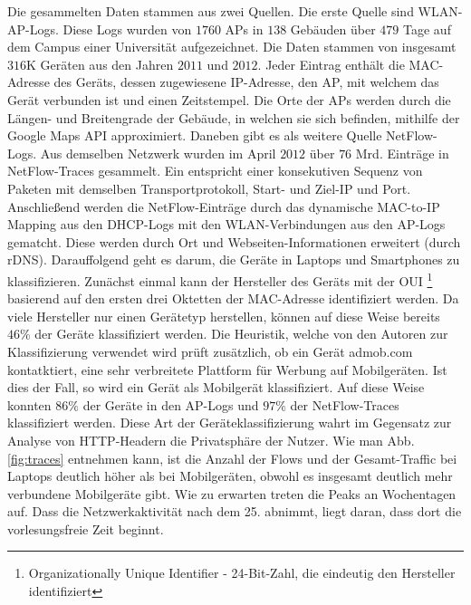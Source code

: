 \documentclass[12pt, a4paper]{article}
\begin{document}
Die gesammelten Daten stammen aus zwei Quellen. Die erste Quelle sind WLAN-AP-Logs. Diese Logs wurden von $1760$ APs in $138$ Gebäuden über $479$ Tage auf dem
Campus einer Universität aufgezeichnet. Die Daten stammen von insgesamt $316$\textsc{K} Geräten aus den Jahren $2011$ und $2012$.
Jeder Eintrag enthält die MAC-Adresse des Geräts, dessen zugewiesene IP-Adresse, den AP, mit welchem das Gerät verbunden ist
und einen Zeitstempel.
Die Orte der APs werden durch die Längen- und Breitengrade der Gebäude, in welchen sie sich befinden, mithilfe der Google Maps API
approximiert. Daneben gibt es als weitere Quelle NetFlow-Logs. Aus demselben Netzwerk wurden im April $2012$ über $76$ Mrd.
Einträge in NetFlow-Traces gesammelt. Ein  entspricht einer konsekutiven Sequenz von Paketen mit demselben
Transportprotokoll, Start- und Ziel-IP und Port. \cite{Alipour2018}
Anschließend werden die NetFlow-Einträge durch das dynamische MAC-to-IP Mapping aus den DHCP-Logs mit den WLAN-Verbindungen
aus den AP-Logs gematcht. Diese werden durch Ort und Webseiten-Informationen erweitert (durch rDNS).
\newline\newline
Darauffolgend geht es darum, die Geräte in Laptops und Smartphones zu klassifizieren.
Zunächst einmal kann der Hersteller des Geräts mit der OUI \footnote{Organizationally Unique Identifier - 24-Bit-Zahl, die eindeutig den Hersteller identifiziert} basierend auf den
ersten drei Oktetten der MAC-Adresse identifiziert werden. Da viele Hersteller nur einen Gerätetyp herstellen, können auf diese Weise bereits
$46 \%$ der Geräte klassifiziert werden. Die Heuristik, welche von den Autoren zur Klassifizierung verwendet wird
prüft zusätzlich, ob ein Gerät admob.com kontatktiert, eine sehr verbreitete Plattform für Werbung auf Mobilgeräten.
Ist dies der Fall, so wird ein Gerät als Mobilgerät klassifiziert. Auf diese Weise konnten $86 \%$ der Geräte in den AP-Logs
und $97 \%$ der NetFlow-Traces klassifiziert werden. Diese Art der Geräteklassifizierung wahrt im Gegensatz zur Analyse von 
HTTP-Headern die Privatsphäre der Nutzer.\newline
Wie man Abb. \ref{fig:traces} entnehmen kann, ist die Anzahl der Flows und der
Gesamt-Traffic bei Laptops deutlich höher als bei Mobilgeräten, obwohl es insgesamt deutlich mehr verbundene Mobilgeräte gibt.
Wie zu erwarten treten die Peaks an Wochentagen auf. Dass die Netzwerkaktivität nach dem 25. abnimmt, liegt daran, dass dort
die vorlesungsfreie Zeit beginnt.
\end{document}
